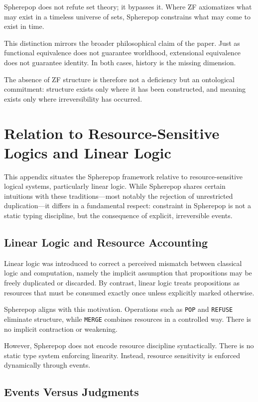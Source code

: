 \documentclass[11pt]{article}
\begin{document}
Spherepop does not refute set theory; it bypasses it. Where ZF axiomatizes what may exist in a timeless universe of sets, Spherepop constrains what may come to exist in time.

This distinction mirrors the broader philosophical claim of the paper. Just as functional equivalence does not guarantee worldhood, extensional equivalence does not guarantee identity. In both cases, history is the missing dimension.

The absence of ZF structure is therefore not a deficiency but an ontological commitment: structure exists only where it has been constructed, and meaning exists only where irreversibility has occurred.

\section{Relation to Resource-Sensitive Logics and Linear Logic}

This appendix situates the Spherepop framework relative to resource-sensitive logical systems, particularly linear logic. While Spherepop shares certain intuitions with these traditions—most notably the rejection of unrestricted duplication—it differs in a fundamental respect: constraint in Spherepop is not a static typing discipline, but the consequence of explicit, irreversible events.

\subsection{Linear Logic and Resource Accounting}

Linear logic was introduced to correct a perceived mismatch between classical logic and computation, namely the implicit assumption that propositions may be freely duplicated or discarded. By contrast, linear logic treats propositions as resources that must be consumed exactly once unless explicitly marked otherwise.

Spherepop aligns with this motivation. Operations such as \texttt{POP} and \texttt{REFUSE} eliminate structure, while \texttt{MERGE} combines resources in a controlled way. There is no implicit contraction or weakening.

However, Spherepop does not encode resource discipline syntactically. There is no static type system enforcing linearity. Instead, resource sensitivity is enforced dynamically through events.

\subsection{Events Versus Judgments}
\end{document}
